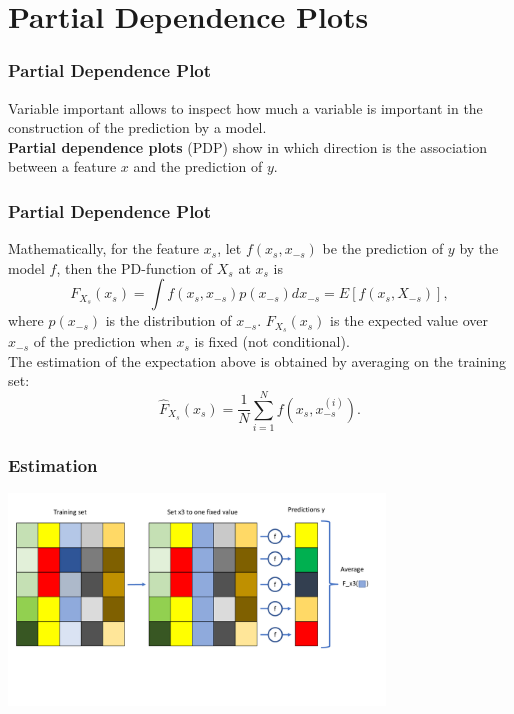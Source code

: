 \section{Partial Dependence Plots}
\begin{frame}
\frametitle{Partial Dependence Plot}
Variable important allows to inspect how much a variable is important in the construction of the prediction by a model.\\ 
\vspace{0.2cm}
{\bf Partial dependence plots} (PDP) show in which direction is the association between a feature $x$ and the prediction of $y$. 
\end{frame}
\begin{frame}
\frametitle{Partial Dependence Plot}
Mathematically, for the feature $x_s$, let $f(x_s, x_{-s})$ be the prediction of $y$ by the model $f$, then the PD-function of $X_s$ at $x_s$ is
$$
F_{X_s}(x_s) = \int f(x_s, x_{-s}) p(x_{-s}) dx_{-s} = E[f(x_s, X_{-s})],
$$
where $p(x_{-s})$ is the distribution of $x_{-s}$. $F_{X_s}(x_s)$ is the expected value over $x_{-s}$ of the prediction when $x_s$ is fixed (not conditional). \\
\vspace{0.3cm}
The estimation of the expectation above is obtained by averaging on the training set:
$$
\hat{F}_{X_s}(x_s) = \frac{1}{N}\sum_{i=1}^N f(x_s, x_{-s}^{(i)}).
$$
\end{frame}
\begin{frame}
\frametitle{Estimation}
\begin{center}
\includegraphics[width=10cm]{../Graphs/PDP_Illustr.pdf}
\end{center}
\end{frame}
